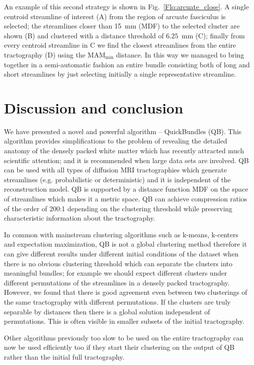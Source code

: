 \documentclass{bioinfo}
\begin{document}
An example of this second strategy is shown in
Fig.~\ref{Flo:arcuate_close}. A single centroid streamline of interest
(A) from the region of arcuate fasciculus is selected; the streamlines
closer than 15~mm (MDF) to the selected cluster are shown (B) and
clustered with a distance threshold of $6.25$~mm (C); finally from every
centroid streamline in C we find the closest streamlines from the entire
tractography (D) using the $\textrm{MAM}_{\textrm{min}}$ distance. In
this way we managed to bring together in a semi-automatic fashion an
entire bundle consisting both of long and short streamlines by just
selecting initially a single representative streamline.

\section{Discussion and conclusion}

We have presented a novel and powerful algorithm -- QuickBundles
(QB). This algorithm provides simplifications to the problem of
revealing the detailed anatomy of the densely packed white matter which
has recently attracted much scientific attention; and it is recommended
when large data sets are involved. QB can be used with all types of
diffusion MRI tractographies which generate streamlines
(e.g. probabilistic or deterministic) and it is independent of the
reconstruction model. QB is supported by a distance function MDF on the
space of streamlines which makes it a metric space. QB can achieve
compression ratios of the order of 200:1 depending on the clustering
threshold while preserving characteristic information about the
tractography.

In common with mainstream clustering algorithms such as k-means,
k-centers and expectation maximization, QB is not a global clustering
method therefore it can give different results under different initial
conditions of the dataset when there is no obvious clustering threshold
which can separate the clusters into meaningful bundles; for example we
should expect different clusters under different permutations of the
streamlines in a densely packed tractography. However, we found that
there is good agreement even between two clusterings of the same
tractography with different permutations. If the clusters are truly
separable by distances then there is a global solution independent of
permutations. This is often visible in smaller subsets of the initial
tractography.

Other algorithms previously too slow to be used on the entire
tractography can now be used efficiently too if they start their clustering
on the output of QB rather than the initial full tractography.
\end{document}
